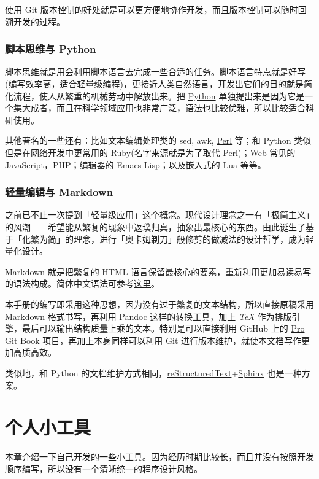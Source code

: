 \documentclass[a4paper,openany]{book}
\newcommand{\chap}[1]{\newpage\thispagestyle{empty}\chapter{#1}\label{chap:\thechapter}}
\begin{document}
使用 Git 版本控制的好处就是可以更方便地协作开发，而且版本控制可以随时回溯开发的过程。

\subsection{脚本思维与 Python}

脚本思维就是用会利用脚本语言去完成一些合适的任务。脚本语言特点就是好写(编写效率高，适合轻量级编程)，更接近人类自然语言，开发出它们的目的就是简化流程，使人从繁重的机械劳动中解放出来。把 \href{http://www.python.org}{Python} 单独提出来是因为它是一个集大成者，而且在科学领域应用也非常广泛，语法也比较优雅，所以比较适合科研使用。

其他著名的一些还有：比如文本编辑处理类的 sed, awk, \href{http://www.perl.org}{Perl} 等；和 Python 类似但是在网络开发中更常用的 \href{https://www.ruby-lang.org}{Ruby}(名字来源就是为了取代 Perl)；Web 常见的 JavaScript，PHP；编辑器的 Emacs Lisp；以及嵌入式的 \href{http://www.lua.org}{Lua} 等等。

\subsection{轻量编辑与 Markdown}

之前已不止一次提到「轻量级应用」这个概念。现代设计理念之一有「极简主义」的风潮------希望能从繁复的现象中返璞归真，抽象出最核心的东西。由此诞生了基于「化繁为简」的理念，进行「奥卡姆剃刀」般修剪的做减法的设计哲学，成为轻量化设计。

\href{http://daringfireball.net/projects/markdown/}{Markdown} 就是把繁复的 HTML 语言保留最核心的要素，重新利用更加易读易写的语法构成。简体中文语法可参考\href{http://wowubuntu.com/markdown/}{这里}。

本手册的编写即采用这种思想，因为没有过于繁复的文本结构，所以直接原稿采用 Markdown 格式书写，再利用 \href{http://johnmacfarlane.net/pandoc/}{Pandoc} 这样的转换工具，加上 \emph{\TeX} 作为排版引擎，最后可以输出结构质量上乘的文本。特别是可以直接利用 GitHub 上的 \href{https://github.com/progit/progit}{Pro Git Book 项目}，再加上本身同样可以利用 Git 进行版本维护，就使本文档写作更加高质高效。

类似地，和 Python 的文档维护方式相同，\href{http://docutils.sourceforge.net/rst.html}{reStructuredText}+\href{http://sphinx-doc.org}{Sphinx} 也是一种方案。

\chap{个人小工具}

本章介绍一下自己开发的一些小工具。因为经历时期比较长，而且并没有按照开发顺序编写，所以没有一个清晰统一的程序设计风格。
\end{document}
